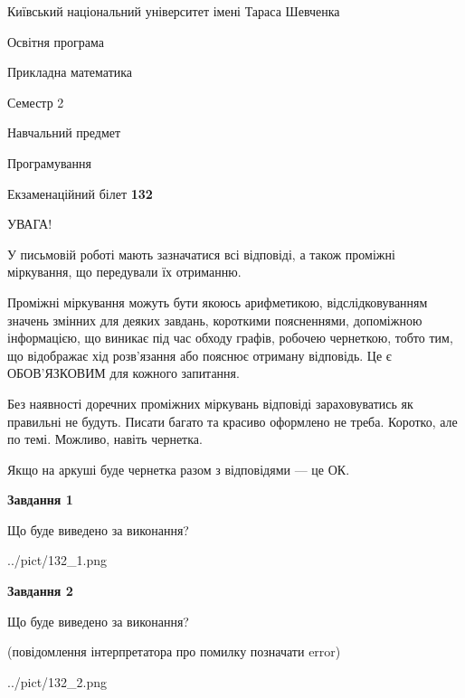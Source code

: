 \documentclass[12pt, ukrainian]{article}
\begin{document}
{{\begin {small}\par
{ \center  Київський національний університет імені Тараса Шевченка \par}
{\parbox {5 cm}{Освітня програма \hfill}{\parbox {7 cm}{Прикладна математика\hfill}}\parbox {6 cm}{\hfill Семестр 2}}\par
{\parbox {5 cm} {Навчальний предмет \hfill}\parbox {7 cm}{Програмування \hfill}\parbox {6cm}{\hfill}\par}\vspace{-7pt} \end{small}}{\center Екзаменаційний білет \No \textbf
{ 132 }\par}}
{
\begin {large}
УВАГА!

У письмовій роботі мають зазначатися всі відповіді, а також проміжні міркування, що передували їх отриманню.

Проміжні міркування можуть бути якоюсь арифметикою, відслідковуванням зна\-чень змінних для деяких завдань,
короткими поясненнями, допоміжною інформацією, що виникає під час обходу графів, робочею чернеткою,
тобто тим, що відображає хід розв’язання або пояснює отриману відповідь.
Це є ОБОВ’ЯЗКОВИМ для кожного запитання.

Без наявності доречних проміжних міркувань відповіді зараховуватись як правиль\-ні не будуть.
Писати багато та красиво оформлено не треба. Коротко, але по темі. Можли\-во, навіть чернетка.

Якщо на аркуші буде чернетка разом з відповідями --- це ОК.

\newpage

{\begin {center}\textbf{Завдання 1}\end {center}}\par
Що буде виведено за виконання?\par
\begin{center}
	{../pict/132_1.png}
\end{center}
\newpage

{\begin {center}\textbf{Завдання 2}\end {center}}\par
Що буде виведено за виконання?\par
 (повідомлення інтерпретатора про помилку позначати error)\par
\begin{center}
	{../pict/132_2.png}
\end{center}
\newpage


\end{large}}
\end{document}
